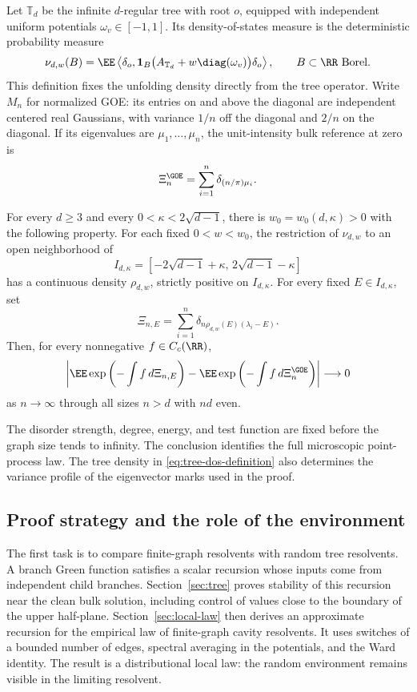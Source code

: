 Let $\mathbb T_d$ be the infinite $d$-regular tree with root $o$, equipped
with independent uniform potentials $\omega_v\in[-1,1]$.  Its density-of-states
measure is the deterministic probability measure
\begin{equation}\label{eq:tree-dos-definition}
 \nu_{d,w}(B)=
 \EE\left\langle\delta_o,
 \mathbf1_B\bigl(A_{\mathbb T_d}+w\diag(\omega_v)\bigr)\delta_o
 \right\rangle,
 \qquad B\subset\RR\ \text{Borel}.
\end{equation}
This definition fixes the unfolding density directly from the tree
operator.  Write $M_n$ for normalized GOE: its entries on and above
the diagonal are independent centered real Gaussians, with variance
$1/n$ off the diagonal and $2/n$ on the diagonal.  If its eigenvalues
are $\mu_1,\ldots,\mu_n$, the unit-intensity bulk reference at zero is
\[
 \Xi_n^{\GOE}=\sum_{i=1}^n\delta_{(n/\pi)\mu_i}.
\]

\begin{theorem}\label{thm:main}
For every $d\ge3$ and every $0<\kappa<2\sqrt{d-1}$, there is
$w_0=w_0(d,\kappa)>0$ with the following property.  For each fixed
$0<w<w_0$, the restriction of $\nu_{d,w}$ to an open neighborhood of
\[
 I_{d,\kappa}=[-2\sqrt{d-1}+\kappa,\,2\sqrt{d-1}-\kappa]
\]
has a continuous density $\rho_{d,w}$, strictly positive on
$I_{d,\kappa}$.  For every fixed $E\in I_{d,\kappa}$, set
\[
 \Xi_{n,E}=\sum_{i=1}^n
       \delta_{n\rho_{d,w}(E)(\lambda_i-E)}.
\]
Then, for every nonnegative $f\in C_c(\RR)$,
\begin{equation}\label{eq:main-laplace}
 \left|
 \EE\exp\left(-\int f\,d\Xi_{n,E}\right)
 -\EE\exp\left(-\int f\,d\Xi_n^{\GOE}\right)
 \right|\longrightarrow0
\end{equation}
as $n\to\infty$ through all sizes $n>d$ with $nd$ even.
\end{theorem}

The disorder strength, degree, energy, and test function are fixed before
the graph size tends to infinity.  The conclusion identifies the full
microscopic point-process law.  The tree density in
\eqref{eq:tree-dos-definition} also determines the variance profile of
the eigenvector marks used in the proof.

\subsection{Proof strategy and the role of the environment}

The first task is to compare finite-graph resolvents with random tree
resolvents.  A branch Green function satisfies a scalar recursion whose
inputs come from independent child branches.  Section~\ref{sec:tree}
proves stability of this recursion near the clean bulk solution, including
control of values close to the boundary of the upper half-plane.
Section~\ref{sec:local-law} then derives an approximate recursion for
the empirical law of finite-graph cavity resolvents.  It uses switches
of a bounded number of edges, spectral averaging in the potentials, and
the Ward identity.  The result is a distributional local law: the random
environment remains visible in the limiting resolvent.

